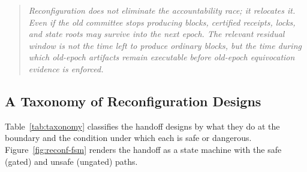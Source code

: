 \begin{quote}
\emph{Reconfiguration does not eliminate the accountability race; it relocates it. Even if the old
committee stops producing blocks, certified receipts, locks, and state roots may survive into the
next epoch. The relevant residual window is not the time left to produce ordinary blocks, but the
time during which old-epoch artifacts remain executable before old-epoch equivocation evidence is
enforced.}
\end{quote}

\subsection{A Taxonomy of Reconfiguration Designs}
\label{sec:taxonomy}

Table~\ref{tab:taxonomy} classifies the handoff designs by what they do at the boundary and the
condition under which each is safe or dangerous. Figure~\ref{fig:reconf-fsm} renders the handoff as a
state machine with the safe (gated) and unsafe (ungated) paths.

